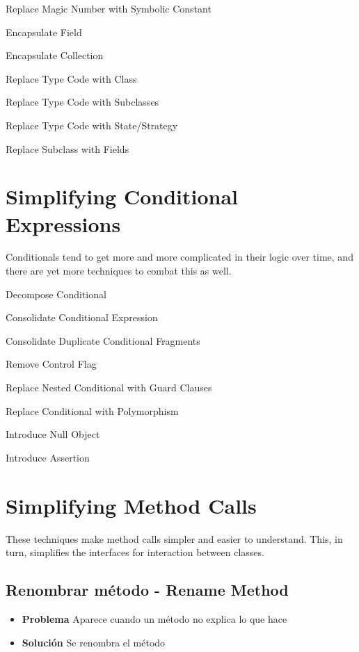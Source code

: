 \documentclass[11pt,a4paper,oneside]{book}
\begin{document}
    Replace Magic Number with Symbolic Constant
    
    Encapsulate Field
    
    Encapsulate Collection
    
    Replace Type Code with Class
    
    Replace Type Code with Subclasses
    
    Replace Type Code with State/Strategy
    
    Replace Subclass with Fields




\section{Simplifying Conditional Expressions}

Conditionals tend to get more and more complicated in their logic over time, and there are yet more techniques to combat this as well.

    Decompose Conditional
    
    Consolidate Conditional Expression
    
    Consolidate Duplicate Conditional Fragments
    
    Remove Control Flag

    Replace Nested Conditional with Guard Clauses
    
    Replace Conditional with Polymorphism
    
    Introduce Null Object
    
    Introduce Assertion





\section{Simplifying Method Calls}

These techniques make method calls simpler and easier to understand. This, in turn, simplifies the interfaces for interaction between classes.

\subsection{     Renombrar método - Rename Method}
\label{renombrarmetodo}
\begin{itemize}
    \item \textbf{Problema} Aparece cuando un método no explica lo que hace 
    \item \textbf{Solución} Se renombra el método
\end{itemize}
    
\end{document}
